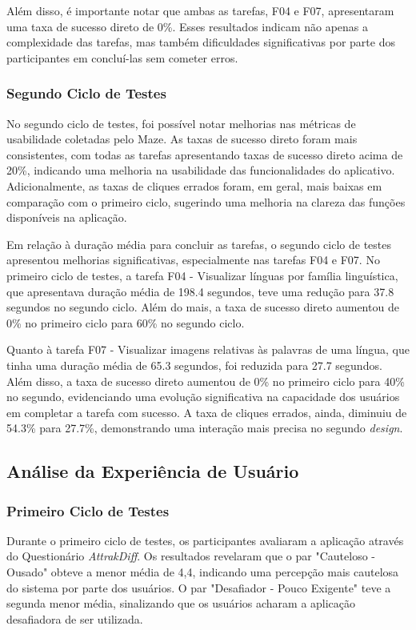 Além disso, é importante notar que ambas as tarefas, F04 e F07, apresentaram uma taxa de sucesso direto de 0\%. Esses resultados indicam não apenas a complexidade das tarefas, mas também dificuldades significativas por parte dos participantes em concluí-las sem cometer erros. 

\subsubsection{Segundo Ciclo de Testes}
\label{sec:Segundo Ciclo de Testes}
No segundo ciclo de testes, foi possível notar melhorias nas métricas de usabilidade coletadas pelo Maze. As taxas de sucesso direto foram mais consistentes, com todas as tarefas apresentando taxas de sucesso direto acima de 20\%, indicando uma melhoria na usabilidade das 
funcionalidades do aplicativo. Adicionalmente, as taxas de cliques errados foram, em geral, mais baixas em comparação com o primeiro ciclo, sugerindo uma melhoria na clareza das funções disponíveis na aplicação.

Em relação à duração média para concluir as tarefas, o segundo ciclo de testes apresentou melhorias significativas, especialmente nas tarefas F04 e F07. No primeiro ciclo de testes, a tarefa F04 - Visualizar línguas por família linguística, que apresentava duração média de 
198.4 segundos, teve uma redução para 37.8 segundos no segundo ciclo. Além do mais, a taxa de sucesso direto aumentou de 0\% no primeiro ciclo para 60\% no segundo ciclo.

Quanto à tarefa F07 - Visualizar imagens relativas às palavras de uma língua, que tinha uma duração média de 65.3 segundos, foi reduzida para 27.7 segundos. Além disso, a taxa de sucesso direto aumentou de 0\% no primeiro ciclo para 40\% no segundo, evidenciando uma evolução 
significativa na capacidade dos usuários em completar a tarefa com sucesso. A taxa de cliques errados, ainda, diminuiu de 54.3\% para 27.7\%, demonstrando uma interação mais precisa no segundo \textit{design}.

\subsection{Análise da Experiência de Usuário}
\label{sec:Análise da Experiência de Usuário}

\subsubsection{Primeiro Ciclo de Testes}
\label{sec:Primeiro Ciclo de Testes2}
Durante o primeiro ciclo de testes, os participantes avaliaram a aplicação através do Questionário \textit{AttrakDiff}. Os resultados revelaram que o par "Cauteloso - Ousado" obteve a menor média de 4,4, indicando uma percepção mais cautelosa do sistema por parte dos usuários. O par 
"Desafiador - Pouco Exigente" teve a segunda menor média, sinalizando que os usuários acharam a aplicação desafiadora de ser utilizada.

